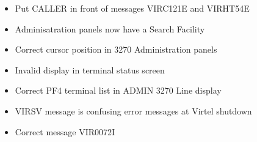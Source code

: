 \documentclass[letterpaper,10pt,english]{sphinxmanual}
\begin{document}
\sphinxAtStartPar
{}
\begin{itemize}
\item {} 
\sphinxAtStartPar
Put CALLER in front of messages VIRC121E and VIRHT54E

\end{itemize}

\sphinxAtStartPar
{}
\begin{itemize}
\item {} 
 Adminisatration panels now have a Search Facility

\end{itemize}

\sphinxAtStartPar
{}
\begin{itemize}
\item {} 
\sphinxAtStartPar
Correct cursor position in 3270 Administration panels

\end{itemize}

\sphinxAtStartPar
{}
\begin{itemize}
\item {} 
\sphinxAtStartPar
Invalid display in terminal status screen

\end{itemize}

\sphinxAtStartPar
{}
\begin{itemize}
\item {} 
\sphinxAtStartPar
Correct PF4 terminal list in ADMIN 3270 Line display

\end{itemize}

\sphinxAtStartPar
{}
\begin{itemize}
\item {} 
\sphinxAtStartPar
VIRSV message is confusing error messages at Virtel shutdown

\end{itemize}

\sphinxAtStartPar
{}
\begin{itemize}
\item {} 
\sphinxAtStartPar
Correct message VIR0072I

\end{itemize}
\end{document}

